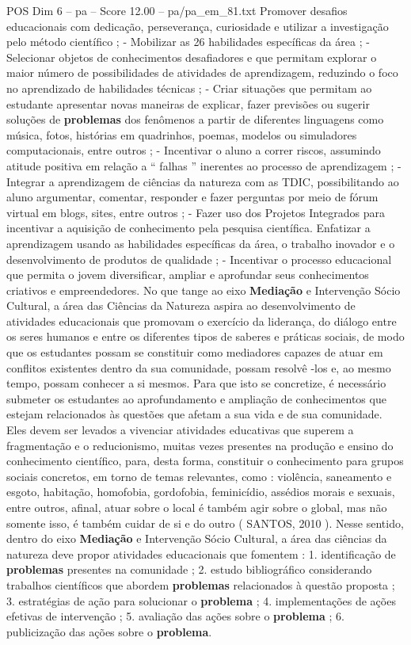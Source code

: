 \begin{textsample}{POS Dim 6 – pa – Score 12.00 – pa/pa\_em\_81.txt}
Promover desafios educacionais com dedicação, perseverança, curiosidade e utilizar a investigação pelo método científico ; - Mobilizar as 26 habilidades específicas da área ; - Selecionar objetos de conhecimentos desafiadores e que permitam explorar o maior número de possibilidades de atividades de aprendizagem, reduzindo o foco no aprendizado de habilidades técnicas ; - Criar situações que permitam ao estudante apresentar novas maneiras de explicar, fazer previsões ou sugerir soluções de \textbf{problemas} dos fenômenos a partir de diferentes linguagens como música, fotos, histórias em quadrinhos, poemas, modelos ou simuladores computacionais, entre outros ; - Incentivar o aluno a correr riscos, assumindo atitude positiva em relação a “ falhas ” inerentes ao processo de aprendizagem ; - Integrar a aprendizagem de ciências da natureza com as TDIC, possibilitando ao aluno argumentar, comentar, responder e fazer perguntas por meio de fórum virtual em blogs, sites, entre outros ; - Fazer uso dos Projetos Integrados para incentivar a aquisição de conhecimento pela pesquisa científica.
Enfatizar a aprendizagem usando as habilidades específicas da área, o trabalho inovador e o desenvolvimento de produtos de qualidade ; - Incentivar o processo educacional que permita o jovem diversificar, ampliar e aprofundar seus conhecimentos criativos e empreendedores.
No que tange ao eixo \textbf{Mediação} e Intervenção Sócio Cultural, a área das Ciências da Natureza aspira ao desenvolvimento de atividades educacionais que promovam o exercício da liderança, do diálogo entre os seres humanos e entre os diferentes tipos de saberes e práticas sociais, de modo que os estudantes possam se constituir como mediadores capazes de atuar em conflitos existentes dentro da sua comunidade, possam resolvê -los e, ao mesmo tempo, possam conhecer a si mesmos.
Para que isto se concretize, é necessário submeter os estudantes ao aprofundamento e ampliação de conhecimentos que estejam relacionados às questões que afetam a sua vida e de sua comunidade.
Eles devem ser levados a vivenciar atividades educativas que superem a fragmentação e o reducionismo, muitas vezes presentes na produção e ensino do conhecimento científico, para, desta forma, constituir o conhecimento para grupos sociais concretos, em torno de temas relevantes, como : violência, saneamento e esgoto, habitação, homofobia, gordofobia, feminicídio, assédios morais e sexuais, entre outros, afinal, atuar sobre o local é também agir sobre o global, mas não somente isso, é também cuidar de si e do outro ( SANTOS, 2010 ).
Nesse sentido, dentro do eixo \textbf{Mediação} e Intervenção Sócio Cultural, a área das ciências da natureza deve propor atividades educacionais que fomentem : 1. identificação de \textbf{problemas} presentes na comunidade ; 2. estudo bibliográfico considerando trabalhos científicos que abordem \textbf{problemas} relacionados à questão proposta ; 3. estratégias de ação para solucionar o \textbf{problema} ; 4. implementações de ações efetivas de intervenção ; 5. avaliação das ações sobre o \textbf{problema} ; 6. publicização das ações sobre o \textbf{problema}.

\end{textsample}
